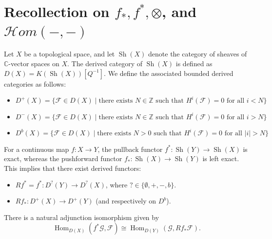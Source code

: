 
\section{Recollection on $f_*, f^*, \otimes$, and $\mathcal{H}om(-, -)$}

\begin{definition}
Let $X$ be a topological space, and let $\operatorname{Sh}(X)$ denote the category of sheaves of $\mathbb{C}$-vector spaces on $X$. The derived category of $\operatorname{Sh}(X)$ is defined as $D(X) = K(\operatorname{Sh}(X))[Q^{-1}]$. 
We define the associated bounded derived categories as follows:
\begin{itemize}
    \item $D^+(X) = \{ \mathcal{F} \in D(X) \mid \text{there exists } N\in\mathbb{Z} \text{ such that } H^i(\mathcal{F})=0 \text{ for all } i<N \}$
    \item $D^-(X) = \{ \mathcal{F} \in D(X) \mid \text{there exists } N\in\mathbb{Z} \text{ such that } H^i(\mathcal{F})=0 \text{ for all } i>N \}$
    \item $D^b(X) = \{ \mathcal{F} \in D(X) \mid \text{there exists } N>0 \text{ such that } H^i(\mathcal{F})=0 \text{ for all } |i|>N \}$
\end{itemize}
\end{definition}

For a continuous map $f: X \to Y$, the pullback functor $f^*: \operatorname{Sh}(Y) \to \operatorname{Sh}(X)$ is exact, whereas the pushforward functor $f_*: \operatorname{Sh}(X) \to \operatorname{Sh}(Y)$ is left exact. This implies that there exist derived functors:
\begin{itemize}
    \item $Rf^* = f^* : D^?(Y) \to D^?(X)$, where $? \in \{\emptyset, +, -, b\}$.
    \item $Rf_* : D^+(X) \to D^+(Y)$ (and respectively on $D^b$).
\end{itemize}

\begin{proposition}[Adjunction]
There is a natural adjunction isomorphism given by
\begin{equation*}
    \operatorname{Hom}_{D(X)}(f^*\mathcal{G}, \mathcal{F}) \cong \operatorname{Hom}_{D(Y)}(\mathcal{G}, Rf_*\mathcal{F}).
\end{equation*}
\end{proposition}

